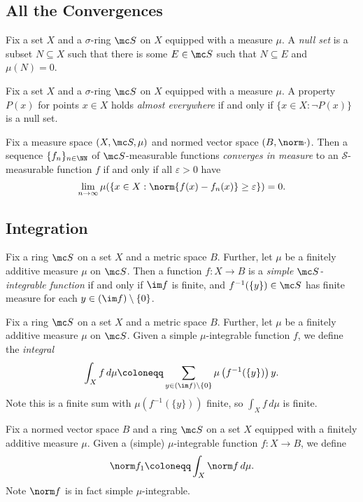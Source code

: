 \documentclass{article}
\begin{document}
\subsection{All the Convergences}
\begin{definition}
	Fix a set $X$ and a $\sigma$-ring $\mc S$ on $X$ equipped with a measure $\mu$. A \textit{null set} is a subset $N\subseteq X$ such that there is some $E\in\mc S$ such that $N\subseteq E$ and $\mu(N)=0$.
\end{definition}
\begin{definition}
	Fix a set $X$ and a $\sigma$-ring $\mc S$ on $X$ equipped with a measure $\mu$. A property $P(x)$ for points $x\in X$ holds \textit{almost everywhere} if and only if $\{x\in X:\lnot P(x)\}$ is a null set.
\end{definition}
\begin{definition} \label{def:converge-in-measure}
	Fix a measure space $(X,\mc S,\mu)$ and normed vector space $(B,\norm\cdot)$. Then a sequence $\{f_n\}_{n\in\NN}$ of $\mc S$-measurable functions \textit{converges in measure} to an $\mathcal S$-measurable function $f$ if and only if all $\varepsilon>0$ have
	\[\lim_{n\to\infty}\mu(\{x\in X:\norm{f(x)-f_n(x)}\ge\varepsilon\})=0.\]
\end{definition}

\subsection{Integration}
\begin{definition}
	Fix a ring $\mc S$ on a set $X$ and a metric space $B$. Further, let $\mu$ be a finitely additive measure $\mu$ on $\mc S$. Then a function $f\colon X\to B$ is a \textit{simple $\mc S$-integrable function} if and only if $\im f$ is finite, and $f^{-1}(\{y\})\in\mc S$ has finite measure for each $y\in(\im f)\setminus\{0\}$.
\end{definition}
\begin{definition}[Integral]
	Fix a ring $\mc S$ on a set $X$ and a metric space $B$. Further, let $\mu$ be a finitely additive measure $\mu$ on $\mc S$. Given a simple $\mu$-integrable function $f$, we define the \textit{integral}
	\[\int_Xf\,d\mu\coloneqq\sum_{y\in(\im f)\setminus\{0\}}\mu\left(f^{-1}(\{y\})\right)y.\]
	Note this is a finite sum with $\mu\left(f^{-1}(\{y\})\right)$ finite, so $\int_Xf\,d\mu$ is finite.
\end{definition}
\begin{notation}
	Fix a normed vector space $B$ and a ring $\mc S$ on a set $X$ equipped with a finitely additive measure $\mu$. Given a (simple) $\mu$-integrable function $f\colon X\to B$, we define
	\[\norm f_1\coloneqq\int_X\norm f\,d\mu.\]
	Note $\norm f$ is in fact simple $\mu$-integrable.
\end{notation}
\end{document}

